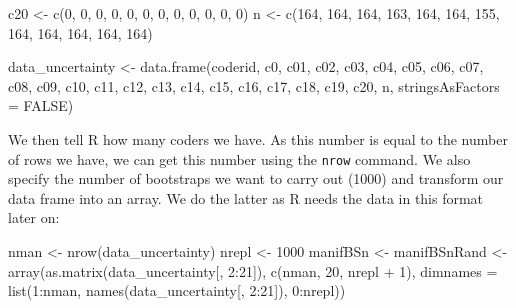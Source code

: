 \documentclass[
]{article}
\newenvironment{Shaded}{\begin{snugshade}}{\end{snugshade}}
\newcommand{\AttributeTok}[1]{\textcolor[rgb]{0.77,0.63,0.00}{#1}}
\newcommand{\ConstantTok}[1]{\textcolor[rgb]{0.00,0.00,0.00}{#1}}
\newcommand{\DecValTok}[1]{\textcolor[rgb]{0.00,0.00,0.81}{#1}}
\newcommand{\FunctionTok}[1]{\textcolor[rgb]{0.00,0.00,0.00}{#1}}
\newcommand{\NormalTok}[1]{#1}
\newcommand{\OtherTok}[1]{\textcolor[rgb]{0.56,0.35,0.01}{#1}}
\newcommand{\SpecialCharTok}[1]{\textcolor[rgb]{0.00,0.00,0.00}{#1}}
\begin{document}
\begin{Shaded}
\begin{Highlighting}[]
\NormalTok{c20 }\OtherTok{\textless{}{-}} \FunctionTok{c}\NormalTok{(}\DecValTok{0}\NormalTok{, }\DecValTok{0}\NormalTok{, }\DecValTok{0}\NormalTok{, }\DecValTok{0}\NormalTok{, }\DecValTok{0}\NormalTok{, }\DecValTok{0}\NormalTok{, }\DecValTok{0}\NormalTok{, }\DecValTok{0}\NormalTok{, }\DecValTok{0}\NormalTok{, }\DecValTok{0}\NormalTok{, }\DecValTok{0}\NormalTok{, }\DecValTok{0}\NormalTok{)}
\NormalTok{n }\OtherTok{\textless{}{-}} \FunctionTok{c}\NormalTok{(}\DecValTok{164}\NormalTok{, }\DecValTok{164}\NormalTok{, }\DecValTok{164}\NormalTok{, }\DecValTok{163}\NormalTok{, }\DecValTok{164}\NormalTok{, }\DecValTok{164}\NormalTok{, }\DecValTok{155}\NormalTok{, }\DecValTok{164}\NormalTok{, }\DecValTok{164}\NormalTok{, }\DecValTok{164}\NormalTok{, }\DecValTok{164}\NormalTok{,}
    \DecValTok{164}\NormalTok{)}

\NormalTok{data\_uncertainty }\OtherTok{\textless{}{-}} \FunctionTok{data.frame}\NormalTok{(coderid, c0, c01, c02, c03, c04,}
\NormalTok{    c05, c06, c07, c08, c09, c10, c11, c12, c13, c14, c15, c16,}
\NormalTok{    c17, c18, c19, c20, n, }\AttributeTok{stringsAsFactors =} \ConstantTok{FALSE}\NormalTok{)}
\end{Highlighting}
\end{Shaded}

We then tell R how many coders we have. As this number is equal to the number of rows we have, we can get this number using the \texttt{nrow} command. We also specify the number of bootstraps we want to carry out (1000) and transform our data frame into an array. We do the latter as R needs the data in this format later on:

\begin{Shaded}
\begin{Highlighting}[]
\NormalTok{nman }\OtherTok{\textless{}{-}} \FunctionTok{nrow}\NormalTok{(data\_uncertainty)}
\NormalTok{nrepl }\OtherTok{\textless{}{-}} \DecValTok{1000}
\NormalTok{manifBSn }\OtherTok{\textless{}{-}}\NormalTok{ manifBSnRand }\OtherTok{\textless{}{-}} \FunctionTok{array}\NormalTok{(}\FunctionTok{as.matrix}\NormalTok{(data\_uncertainty[,}
    \DecValTok{2}\SpecialCharTok{:}\DecValTok{21}\NormalTok{]), }\FunctionTok{c}\NormalTok{(nman, }\DecValTok{20}\NormalTok{, nrepl }\SpecialCharTok{+} \DecValTok{1}\NormalTok{), }\AttributeTok{dimnames =} \FunctionTok{list}\NormalTok{(}\DecValTok{1}\SpecialCharTok{:}\NormalTok{nman, }\FunctionTok{names}\NormalTok{(data\_uncertainty[,}
    \DecValTok{2}\SpecialCharTok{:}\DecValTok{21}\NormalTok{]), }\DecValTok{0}\SpecialCharTok{:}\NormalTok{nrepl))}
\end{Highlighting}
\end{Shaded}
\end{document}
